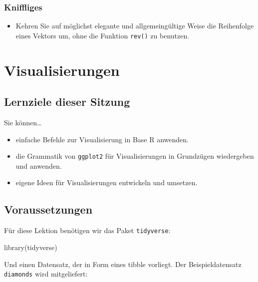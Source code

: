 \documentclass[
  ngerman,
]{article}
\newenvironment{Shaded}{\begin{snugshade}}{\end{snugshade}}
\newcommand{\FunctionTok}[1]{\textcolor[rgb]{0.00,0.00,0.00}{#1}}
\newcommand{\NormalTok}[1]{#1}
\providecommand{\tightlist}{%
  \setlength{\itemsep}{0pt}\setlength{\parskip}{0pt}}
\begin{document}
\hypertarget{kniffliges-1}{%
\subsubsection{Kniffliges}\label{kniffliges-1}}

\begin{itemize}
\tightlist
\item
  Kehren Sie auf möglichst elegante und allgemeingültige Weise die Reihenfolge eines Vektors um, ohne die Funktion \texttt{rev()} zu benutzen.
\end{itemize}

\hypertarget{visualisierungen}{%
\section{Visualisierungen}\label{visualisierungen}}

\hypertarget{lernziele-dieser-sitzung-1}{%
\subsection{Lernziele dieser Sitzung}\label{lernziele-dieser-sitzung-1}}

Sie können\ldots{}

\begin{itemize}
\tightlist
\item
  einfache Befehle zur Visualisierung in Base R anwenden.
\item
  die Grammatik von \texttt{ggplot2} für Visualisierungen in Grundzügen wiedergeben und anwenden.
\item
  eigene Ideen für Visualisierungen entwickeln und umsetzen.
\end{itemize}

\hypertarget{voraussetzungen}{%
\subsection{Voraussetzungen}\label{voraussetzungen}}

Für diese Lektion benötigen wir das Paket \texttt{tidyverse}:

\begin{Shaded}
\begin{Highlighting}[]
\FunctionTok{library}\NormalTok{(tidyverse)}
\end{Highlighting}
\end{Shaded}

Und einen Datensatz, der in Form eines tibble vorliegt. Der Beispieldatensatz \texttt{diamonds} wird mitgeliefert:
\end{document}
